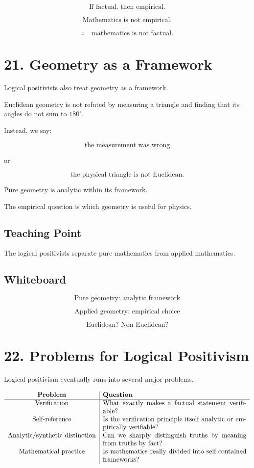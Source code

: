 \documentclass[11pt]{article}
\begin{document}
\[
\text{If factual, then empirical.}
\]

\[
\text{Mathematics is not empirical.}
\]

\[
\therefore
\quad
\text{mathematics is not factual.}
\]

\section*{21. Geometry as a Framework}

Logical positivists also treat geometry as a framework.

Euclidean geometry is not refuted by measuring a triangle and finding that its angles do
not sum to \(180^\circ\).

Instead, we say:

\[
\text{the measurement was wrong}
\]

or

\[
\text{the physical triangle is not Euclidean.}
\]

Pure geometry is analytic within its framework.

The empirical question is which geometry is useful for physics.

\subsection*{Teaching Point}

The logical positivists separate pure mathematics from applied mathematics.

\subsection*{Whiteboard}

\[
\text{Pure geometry: analytic framework}
\]

\[
\text{Applied geometry: empirical choice}
\]

\[
\text{Euclidean? Non-Euclidean?}
\]

\section*{22. Problems for Logical Positivism}

Logical positivism eventually runs into several major problems.

\[
\begin{array}{c|p{0.62\textwidth}}
\textbf{Problem} & \textbf{Question} \\
\hline
\text{Verification} &
What exactly makes a factual statement verifiable? \\

\text{Self-reference} &
Is the verification principle itself analytic or empirically verifiable? \\

\text{Analytic/synthetic distinction} &
Can we sharply distinguish truths by meaning from truths by fact? \\

\text{Mathematical practice} &
Is mathematics really divided into self-contained frameworks?
\end{array}
\]
\end{document}
